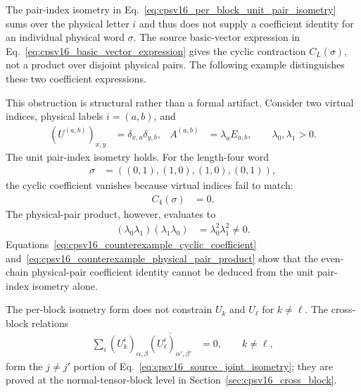 \documentclass{article}
\begin{document}
The pair-index isometry in Eq.~\ref{eq:cpsv16_per_block_unit_pair_isometry}
sums over the physical letter $i$ and thus does not supply a coefficient identity
for an individual physical word $\sigma$. The source basic-vector expression
in Eq.~\ref{eq:cpsv16_basic_vector_expression} gives the cyclic contraction
$C_L(\sigma)$, not a product over disjoint physical pairs. The following
example distinguishes these two coefficient expressions.

This obstruction is structural rather than a formal artifact. Consider two
virtual indices, physical labels $i=(a,b)$, and
\begin{align}
    (U^{(a,b)})_{x,y}
        &=
    \delta_{x,a}\delta_{y,b},
    &
    A^{(a,b)}
        &=
    \lambda_aE_{a,b},
    \qquad
    \lambda_0,\lambda_1>0.
    \label{eq:cpsv16_fixed_word_counterexample_tensor}
\end{align}
The unit pair-index isometry holds. For the length-four word
\begin{align}
    \sigma
        &=
    ((0,1),(1,0),(1,0),(0,1)),
    \label{eq:cpsv16_fixed_word_counterexample_word}
\end{align}
the cyclic coefficient vanishes because virtual indices fail to match:
\begin{align}
    C_4(\sigma)
        &=
    0.
    \label{eq:cpsv16_counterexample_cyclic_coefficient}
\end{align}
The physical-pair product, however, evaluates to
\begin{align}
    (\lambda_0\lambda_1)(\lambda_1\lambda_0)
        &=
    \lambda_0^2\lambda_1^2
        \ne
    0.
    \label{eq:cpsv16_counterexample_physical_pair_product}
\end{align}
Equations~\ref{eq:cpsv16_counterexample_cyclic_coefficient}
and~\ref{eq:cpsv16_counterexample_physical_pair_product} show that the
even-chain physical-pair coefficient identity cannot be deduced from the unit
pair-index isometry alone.

The per-block isometry form does not constrain $U_k$ and $U_\ell$ for
$k\ne\ell$. The cross-block relations
\begin{align}
    \sum_i
    (U_k^i)_{\alpha,\beta}
    \overline{(U_\ell^i)_{\alpha',\beta'}}
        &=
    0,
    \qquad
    k\ne\ell,
    \label{eq:cpsv16_cross_block_residual_isometry}
\end{align}
form the $j\ne j'$ portion of Eq.~\ref{eq:cpsv16_source_joint_isometry}; they
are proved at the normal-tensor-block level in
Section~\ref{sec:cpsv16_cross_block}.
\end{document}
